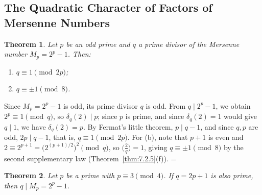 \documentclass[11pt]{article}
\makeatletter
\theoremstyle{ntstyle}
\newtheorem{theorem}{Theorem}[subsection]
\let\nt@closedisplay\]
\def\nt@guardedclose{\@ifnextchar\par{\nt@closeafterpar}{\@ifnextchar\end{\postdisplaypenalty\@M\nt@closedisplay}{\nt@closedisplay}}}
\def\nt@closeafterpar\par{\@ifnextchar\par{\nt@closeafterpar}{\@ifnextchar\end{\postdisplaypenalty\@M\nt@closedisplay\par}{\nt@closedisplay\par}}}
\renewenvironment{proof}[1][\proofname]{\par
  \pushQED{\qed}\normalfont\topsep\medskipamount\edef\nt@afterproof{\@endparpenalty=\the\@endparpenalty\relax}\@beginparpenalty\@M\@endparpenalty\@M\let\]\nt@guardedclose\trivlist\item[]\textit{#1\@addpunct{.}} \ignorespaces}{\ifvmode\addpenalty\@M\fi\popQED\nt@afterproof\endtrivlist\@endpefalse}
\newcommand{\legs}[2]{\bigl(\tfrac{#1}{#2}\bigr)}
\makeatother
\begin{document}
\subsection{The Quadratic Character of Factors of Mersenne Numbers}

\begin{theorem}\label{thm:9.2.1} Let $p$ be an odd prime and $q$ a
	prime divisor of the Mersenne number $M_p = 2^p - 1$. Then:
	\begin{enumerate}[label={\alph*)}]
		\item $q\equiv 1 \pmod{2p}$;
		\item $q \equiv \pm 1 \pmod{8}$.
	\end{enumerate}
\end{theorem}

\begin{proof} Since $M_p = 2^{p} - 1$ is odd, its prime
	divisor $q$ is odd. From $q \mid 2^p - 1$, we obtain $2^p \equiv 1 \pmod{q}$, so $\delta_q(2) \mid
	p$; since $p$ is prime, and since
	$\delta_q(2) = 1$ would give $q \mid 1$, we have
	$\delta_q(2) = p$. By Fermat's little theorem, $p \mid q - 1$, and since
	$q, p$ are odd, $2p \mid q - 1$, that is, $q \equiv 1 \pmod{2p}$. For
	(b), note that $p+1$ is even and $2 \equiv 2^{p+1} = \big(2^{(p+1)/2}\big)^2
		\pmod{q}$, so $\legs{2}{q} = 1$, giving $q \equiv \pm 1
		\pmod{8}$ by the second supplementary law (Theorem~\ref{thm:7.2.5}(f)).
\end{proof}
\begin{theorem}\label{thm:9.2.2} Let $p$ be a prime with $p \equiv 3 \pmod{4}$. If $q = 2p
		+ 1$ is also prime, then $q \mid M_p = 2^{p} - 1$.
\end{theorem}
\end{document}
